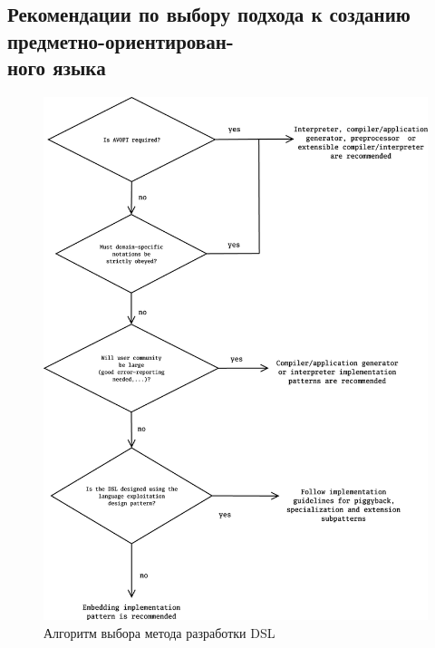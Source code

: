 \begin{appendices}
\section{Рекомендации по выбору подхода \newline  к созданию предметно-ориентирован-\\ного языка}
\label{appendixA}

\begin{figure}[h]
\label{dsl-impl-approach-guideline}
\centering
\includegraphics[width=\linewidth,height=1.1\linewidth,keepaspectratio]{resources/dsl-implementation-guideline.png}
\caption{Алгоритм выбора метода разработки DSL~\cite{when-and-how-develop-dsl}}
\end{figure}

\end{appendices}
